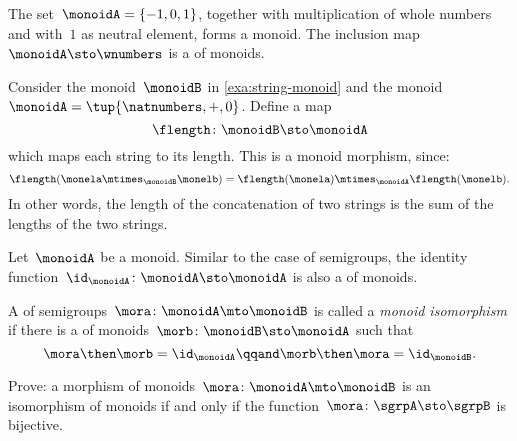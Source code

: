 \begin{example}
  The set~$\monoidA = \{ -1, 0, 1 \}$, together with multiplication of whole numbers and with~$1$ as neutral element, forms a monoid. The inclusion map~$\monoidA \sto \wnumbers$ is a \whomo of monoids.
\end{example}

\begin{example}
  \label{exa:string-length}
  Consider the monoid~$\monoidB$ in \cref{exa:string-monoid} and the monoid~$\monoidA=\tup{\natnumbers, +,0}$.
  Define a map
  \begin{equation*}
    \flength \colon \monoidB \sto \monoidA
\end{equation*}
  which maps each string to its length. This is a monoid morphism, since:
\begin{equation*}
  \flength(\monela \mtimes_\monoidB \monelb)=\flength(\monela)\mtimes_\monoidA \flength(\monelb).
\end{equation*}
  In other words, the length of the concatenation of two strings is the sum of the lengths of the two strings.
\end{example}



\begin{definition}
  \label{def:identity-mon-mor}
  Let~$\monoidA$ be a monoid. Similar to the case of semigroups, the identity function~$\id_\monoidA\colon \monoidA \sto \monoidA$ is also a \whomo of monoids.
\end{definition}



\begin{definition}
  \label{def:monoid-iso}
  A \whomo of semigroups~$\mora\colon \monoidA \mto \monoidB$ is called a \emph{monoid isomorphism} if there is a \whomo of monoids~$\morb\colon \monoidB \sto \monoidA$ such that
  \begin{equation}
    \mora \then \morb = \id_\monoidA \qqand \morb \then \mora = \id_\monoidB.
  \end{equation}
\end{definition}


\begin{gradedexercise}
  Prove: a morphism of monoids~$\mora\colon \monoidA \mto \monoidB$ is an isomorphism of monoids if and only if the function~$\mora\colon \sgrpA \sto \sgrpB$ is bijective.
\end{gradedexercise}



